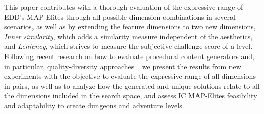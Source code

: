 This paper contributes with %
a thorough evaluation of the expressive range of EDD's MAP-Elites through all possible dimension combinations in several scenarios, as well as by extending the feature dimensions to %
two new dimensions, \emph{Inner similarity}, which adds a similarity measure independent of the aesthetics, and \emph{Leniency}, which strives to measure the subjective challenge score of a level. Following recent research on how to evaluate procedural content generators and, in particular, quality-diversity approaches~, we present the results from new experiments %
with the objective to evaluate the expressive range of all dimensions in pairs, as well as to analyze how the generated and unique solutions relate to all the dimensions included in the search space, and assess IC MAP-Elites feasibility and adaptability to create dungeons and adventure levels.

